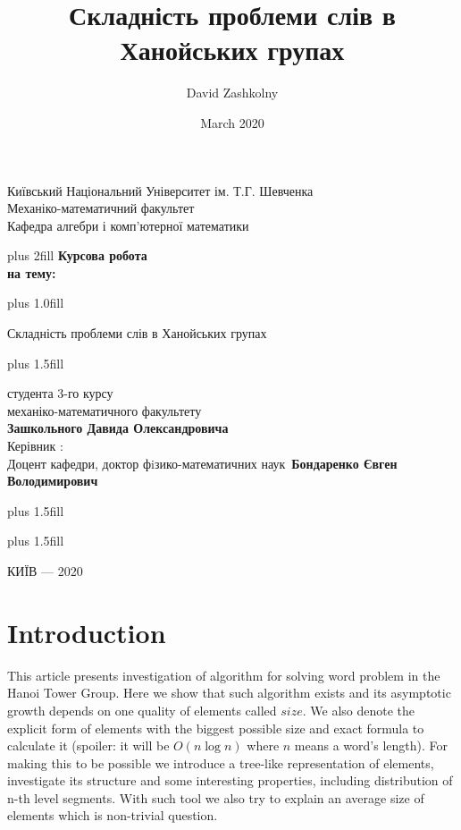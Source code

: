 \documentclass[a4paper,12pt]{amsart}
\title{ 	Складність проблеми слів в Ханойських групах }
\author{ David Zashkolny }
\date{March 2020}
\begin{document}
\thispagestyle {empty}
\begin{center}
	\large  Київський Національний Університет ім. Т.Г. Шевченка \\
	Механіко-математичний факультет \\
	Кафедра алгебри і комп'ютерної математики \par
\end{center}


\begin{center}
	\vskip0cm plus 2fill
	\vspace{2.5cm} {\bf Курсова робота}\\

	{\bf на тему:}\\
\end{center}


\vskip0cm plus 1.0fill



\begin{center}\bf
	{\LARGE
		Складність проблеми слів в Ханойських групах \par}
\end{center}

\vskip0cm plus 1.5fill

\hangindent=7cm  \noindent
студента 3-го курсу\\
механіко-математичного факультету\\
{\bf Зашкольного Давида Олександровича}\\[2cm]
Керівник :\\
Доцент кафедри, доктор фiзико-математичних наук\
{\bf Бондаренко Євген Володимирович}


\vskip0cm plus 1.5fill

\vskip5cm plus 1.5fill
\begin{center}
	КИЇВ --- 2020
\end{center}

\newpage
{}

\tableofcontents

\newpage

\section{Introduction}

This article presents investigation of algorithm for solving word problem in
the Hanoi Tower Group. Here we show that such algorithm exists and its asymptotic growth
depends on one quality of elements called $size$. We also denote the explicit form of
elements with the biggest possible size and exact formula to calculate it (spoiler: it will
be $O(n \log n)$ where $n$ means a word's length). For making this to be possible we
introduce a tree-like representation of elements, investigate its structure and some interesting
properties, including distribution of n-th level segments. With such tool we also try to
explain an average size of elements which is non-trivial question.
\end{document}

